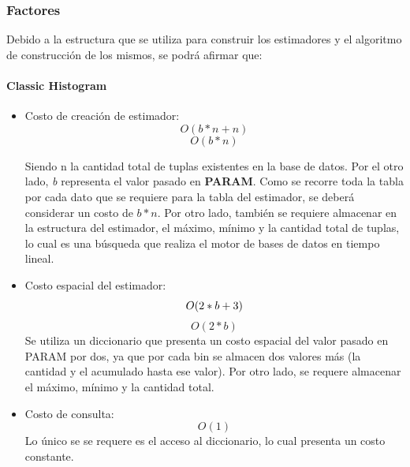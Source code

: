 \documentclass[10pt, a4paper,english,spanish,hidelinks]{article}
\begin{document}
\subsubsection{Factores}

Debido a la estructura que se utiliza para construir los estimadores y el algoritmo de
construcción de los mismos, se podrá afirmar que:

\paragraph{Classic Histogram}
\begin{itemize}

\item Costo de creación de estimador:
\begin{equation}
O(b * n + n )
\end{equation}
\begin{equation}
O(b * n)
\end{equation}

Siendo n la cantidad total de tuplas existentes en la base de datos.
Por el otro lado, \textit{b} representa el valor pasado en \textbf{PARAM}.
Como se recorre toda la tabla por cada dato que se requiere para la tabla del estimador,
se deberá considerar un costo de $b * n$. Por otro lado, también se requiere almacenar en
la estructura del estimador, el máximo, mínimo y la cantidad total de tuplas, lo cual es
una búsqueda que realiza el motor de bases de datos en tiempo lineal.

\item Costo espacial del estimador:
\begin{equation}
O(2 * b + 3 ) \\
\end{equation}
\begin{equation}
O(2 * b)
\end{equation}
Se utiliza un diccionario que presenta un costo espacial del valor pasado en PARAM por dos,
ya que por cada bin se almacen dos valores más (la cantidad y el acumulado hasta ese valor).
Por otro lado, se requere almacenar el máximo, mínimo y la cantidad total.

\item Costo de consulta:
\begin{equation}
O(1)
\end{equation}
Lo único se se requere es el acceso al diccionario, lo cual presenta un costo constante.

\end{itemize}
\end{document}

